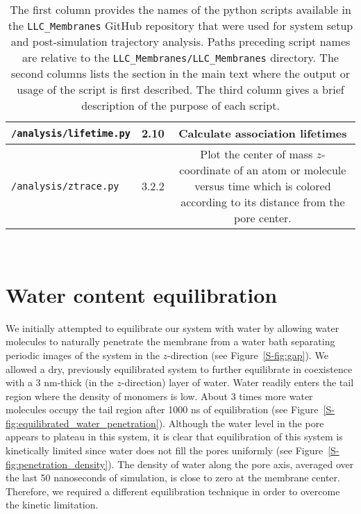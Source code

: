 \begin{table}[htb!]
\begin{tabular}{|A|B|C|}
  \texttt{/analysis/lifetime.py} & 2.10 & Calculate association lifetimes \\ \hline
  
  \texttt{/analysis/ztrace.py} & 3.2.2 & Plot the center of mass $z$-coordinate of an atom or molecule
  versus time which is colored according to its distance from the pore center. \\ \hline

  \end{tabular}

  \caption{The first column provides the names of the python scripts available in
  the \texttt{LLC\_Membranes} GitHub repository that were used for system setup and 
  post-simulation trajectory analysis. Paths preceding script names are relative to the
  \texttt{LLC\_Membranes/LLC\_Membranes} directory. The second columns lists the section in the main
  text where the output or usage of the script is first described. The third column
  gives a brief description of the purpose of each script.
  }~\label{S-table:python_scripts_transport}

  \end{table}

  \section{Water content equilibration}\label{S-section:water_content_equil}

  We initially attempted to equilibrate our system with water by allowing water
  molecules to naturally penetrate the membrane from a water bath separating
  periodic images of the system in the $z$-direction (see Figure~\ref{S-fig:gap}).
  We allowed a dry, previously equilibrated system to further equilibrate in
  coexistence with a 3 nm-thick (in the $z$-direction) layer of water. Water
  readily enters the tail region where the density of monomers is low. About 3
  times more water molecules occupy the tail region after 1000 ns of
  equilibration (see Figure~\ref{S-fig:equilibrated_water_penetration}). Although
  the water level in the pore appears to plateau in this system, it is clear that
  equilibration of this system is kinetically limited since water does not fill
  the pores uniformly (see Figure~\ref{S-fig:penetration_density}). The density of
  water along the pore axis, averaged over the last 50 nanoseconds of simulation,
  is close to zero at the membrane center. Therefore, we required a different
  equilibration technique in order to overcome the kinetic limitation.

